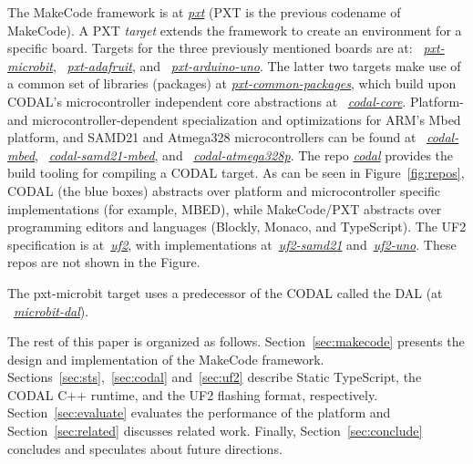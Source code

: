 The MakeCode framework 
is at \emph{\href{https://github.com/microsoft/pxt}{pxt}} (PXT is the previous codename of MakeCode). 
A PXT \emph{target} extends the framework to create an environment for a specific board. Targets
for the three previously mentioned boards are at: 
~\emph{\href{https://github.com/microsoft/pxt-microbit}{pxt-microbit}}, 
~\emph{\href{https://github.com/microsoft/pxt-adafruit}{pxt-adafruit}}, and
~\emph{\href{https://github.com/microsoft/pxt-arduino-uno}{pxt-arduino-uno}}.
The latter two targets make use of a common set of libraries (packages) at
\emph{\href{https://github.com/microsoft/pxt-common-packages}{pxt-common-packages}},
which build upon CODAL's microcontroller independent core abstractions at
~\emph{\href{https://github.com/lancaster-university/codal-core}{codal-core}}.  
Platform- and microcontroller-dependent specialization and optimizations for ARM's Mbed platform, 
and SAMD21 and Atmega328 microcontrollers can be found at
~\emph{\href{https://github.com/lancaster-university/codal-mbed}{codal-mbed}},
~\emph{\href{https://github.com/lancaster-university/codal-samd21-mbed}{codal-samd21-mbed}}, and
~\emph{\href{https://github.com/lancaster-university/codal-atmega328p}{codal-atmega328p}}.
The repo \emph{\href{https://github.com/lancaster-university/codal}{codal}} provides the
build tooling for compiling a CODAL target.  As can be seen in Figure~\ref{fig:repos}, 
CODAL (the blue boxes) abstracts over platform and microcontroller specific
implementations (for example, MBED), while MakeCode/PXT abstracts over programming editors
and languages (Blockly, Monaco, and TypeScript).
The UF2 specification is at~\emph{\href{https://github.com/microsoft/uf2}{uf2}},
with implementations at~\emph{\href{https://github.com/microsoft/uf2-samd21}{uf2-samd21}}
and~\emph{\href{https://github.com/mmoskal/uf2-uno}{uf2-uno}}. These repos are not
shown in the Figure. 

The pxt-microbit target uses a predecessor of the CODAL called the DAL (at
~\emph{\href{https://github.com/lancaster-university/microbit-dal}{microbit-dal}}).

The rest of this paper is organized as follows. Section~\ref{sec:makecode} presents the design and implementation of the MakeCode framework. 
Sections~\ref{sec:sts},~\ref{sec:codal} and~\ref{sec:uf2} describe Static TypeScript, the CODAL C++ runtime, and the UF2 flashing format,
respectively.  Section~\ref{sec:evaluate} evaluates the performance of the platform and
Section~\ref{sec:related} discusses related work. Finally, Section~\ref{sec:conclude} concludes and speculates about future directions. 
